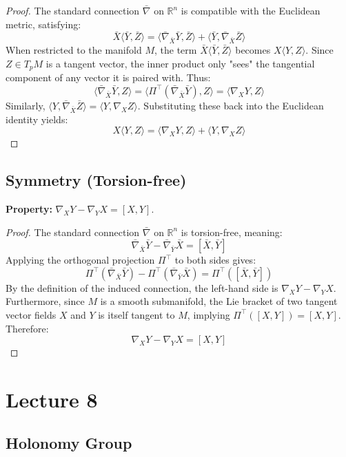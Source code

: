 \documentclass[11pt, a4paper]{article}
\theoremstyle{plain}
\theoremstyle{definition}
\theoremstyle{remark}
\begin{document}
\begin{proof}
The standard connection $\bar{\nabla}$ on $\mathbb{R}^n$ is compatible with the Euclidean metric, satisfying:
\[ \bar{X} \langle \bar{Y}, \bar{Z} \rangle = \langle \bar{\nabla}_{\bar{X}} \bar{Y}, \bar{Z} \rangle + \langle \bar{Y}, \bar{\nabla}_{\bar{X}} \bar{Z} \rangle \]
When restricted to the manifold $M$, the term $\bar{X} \langle \bar{Y}, \bar{Z} \rangle$ becomes $X \langle Y, Z \rangle$. Since $Z \in T_p M$ is a tangent vector, the inner product only "sees" the tangential component of any vector it is paired with. Thus:
\[ \langle \bar{\nabla}_{\bar{X}} \bar{Y}, Z \rangle = \langle \Pi^\top(\bar{\nabla}_{\bar{X}} \bar{Y}), Z \rangle = \langle \nabla_X Y, Z \rangle \]
Similarly, $\langle Y, \bar{\nabla}_{\bar{X}} \bar{Z} \rangle = \langle Y, \nabla_X Z \rangle$. Substituting these back into the Euclidean identity yields:
\[ X \langle Y, Z \rangle = \langle \nabla_X Y, Z \rangle + \langle Y, \nabla_X Z \rangle \]
\end{proof}

\subsection*{Symmetry (Torsion-free)}
\textbf{Property:} $\nabla_X Y - \nabla_Y X = [X, Y]$.

\begin{proof}
The standard connection $\bar{\nabla}$ on $\mathbb{R}^n$ is torsion-free, meaning:
\[ \bar{\nabla}_{\bar{X}} \bar{Y} - \bar{\nabla}_{\bar{Y}} \bar{X} = [\bar{X}, \bar{Y}] \]
Applying the orthogonal projection $\Pi^\top$ to both sides gives:
\[ \Pi^\top(\bar{\nabla}_{\bar{X}} \bar{Y}) - \Pi^\top(\bar{\nabla}_{\bar{Y}} \bar{X}) = \Pi^\top([\bar{X}, \bar{Y}]) \]
By the definition of the induced connection, the left-hand side is $\nabla_X Y - \nabla_Y X$. Furthermore, since $M$ is a smooth submanifold, the Lie bracket of two tangent vector fields $X$ and $Y$ is itself tangent to $M$, implying $\Pi^\top([X, Y]) = [X, Y]$. Therefore:
\[ \nabla_X Y - \nabla_Y X = [X, Y] \]
\end{proof}

\newpage
\section{Lecture 8}
\subsection{Holonomy Group}
\end{document}
